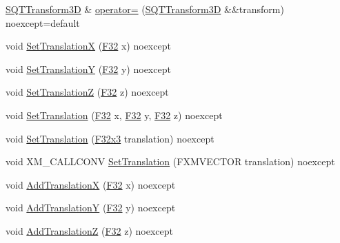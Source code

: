 \begin{DoxyCompactItemize}
\item 
\mbox{\hyperlink{classmage_1_1_s_q_t_transform3_d}{S\+Q\+T\+Transform3D}} \& \mbox{\hyperlink{classmage_1_1_s_q_t_transform3_d_a6a79b73dfa9b3fa178d25df0fafa4a44}{operator=}} (\mbox{\hyperlink{classmage_1_1_s_q_t_transform3_d}{S\+Q\+T\+Transform3D}} \&\&transform) noexcept=default
\item 
void \mbox{\hyperlink{classmage_1_1_s_q_t_transform3_d_a748346ca904abc45fde66973ee7d892c}{Set\+TranslationX}} (\mbox{\hyperlink{namespacemage_aa97e833b45f06d60a0a9c4fc22ae02c0}{F32}} x) noexcept
\item 
void \mbox{\hyperlink{classmage_1_1_s_q_t_transform3_d_aef6eee9fdae2cc2f21c8af11f43f407a}{Set\+TranslationY}} (\mbox{\hyperlink{namespacemage_aa97e833b45f06d60a0a9c4fc22ae02c0}{F32}} y) noexcept
\item 
void \mbox{\hyperlink{classmage_1_1_s_q_t_transform3_d_af7c622ad3de182460dcfd178e298dbd5}{Set\+TranslationZ}} (\mbox{\hyperlink{namespacemage_aa97e833b45f06d60a0a9c4fc22ae02c0}{F32}} z) noexcept
\item 
void \mbox{\hyperlink{classmage_1_1_s_q_t_transform3_d_ae0a9e979cf25222896126208b0cf0cda}{Set\+Translation}} (\mbox{\hyperlink{namespacemage_aa97e833b45f06d60a0a9c4fc22ae02c0}{F32}} x, \mbox{\hyperlink{namespacemage_aa97e833b45f06d60a0a9c4fc22ae02c0}{F32}} y, \mbox{\hyperlink{namespacemage_aa97e833b45f06d60a0a9c4fc22ae02c0}{F32}} z) noexcept
\item 
void \mbox{\hyperlink{classmage_1_1_s_q_t_transform3_d_af2d299fb6f8c2d5a6c5eeb2752c84541}{Set\+Translation}} (\mbox{\hyperlink{namespacemage_a1e3c7a882af461f161caa1cbddaf1fa2}{F32x3}} translation) noexcept
\item 
void X\+M\+\_\+\+C\+A\+L\+L\+C\+O\+NV \mbox{\hyperlink{classmage_1_1_s_q_t_transform3_d_a3714388e32686b94f3d4ba6bc55d227d}{Set\+Translation}} (F\+X\+M\+V\+E\+C\+T\+OR translation) noexcept
\item 
void \mbox{\hyperlink{classmage_1_1_s_q_t_transform3_d_a0a9ade987f55073e896eb4552fdca526}{Add\+TranslationX}} (\mbox{\hyperlink{namespacemage_aa97e833b45f06d60a0a9c4fc22ae02c0}{F32}} x) noexcept
\item 
void \mbox{\hyperlink{classmage_1_1_s_q_t_transform3_d_aad247d922656dc6160a097598fe55aba}{Add\+TranslationY}} (\mbox{\hyperlink{namespacemage_aa97e833b45f06d60a0a9c4fc22ae02c0}{F32}} y) noexcept
\item 
void \mbox{\hyperlink{classmage_1_1_s_q_t_transform3_d_aa6979b42840eb3ec6e41c580354b9833}{Add\+TranslationZ}} (\mbox{\hyperlink{namespacemage_aa97e833b45f06d60a0a9c4fc22ae02c0}{F32}} z) noexcept

\end{DoxyCompactItemize}
